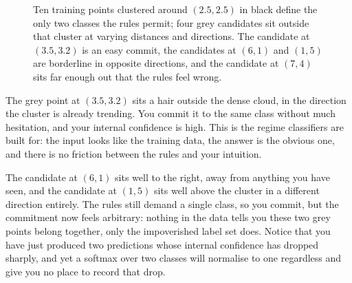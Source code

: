 \begin{figure}
\centering
{}
\caption{Ten training points clustered around $(2.5, 2.5)$ in black define the only two classes the rules permit; four grey candidates sit outside that cluster at varying distances and directions. The candidate at $(3.5, 3.2)$ is an easy commit, the candidates at $(6, 1)$ and $(1, 5)$ are borderline in opposite directions, and the candidate at $(7, 4)$ sits far enough out that the rules feel wrong.}
\label{fig:uncertainty_intro}
\end{figure}

The grey point at $(3.5, 3.2)$ sits a hair outside the dense cloud, in the direction the cluster is already trending.
You commit it to the same class without much hesitation, and your internal confidence is high.
This is the regime classifiers are built for: the input looks like the training data, the answer is the obvious one, and there is no friction between the rules and your intuition.

The candidate at $(6, 1)$ sits well to the right, away from anything you have seen, and the candidate at $(1, 5)$ sits well above the cluster in a different direction entirely.
The rules still demand a single class, so you commit, but the commitment now feels arbitrary: nothing in the data tells you these two grey points belong together, only the impoverished label set does.
Notice that you have just produced two predictions whose internal confidence has dropped sharply, and yet a softmax over two classes will normalise to one regardless and give you no place to record that drop.

